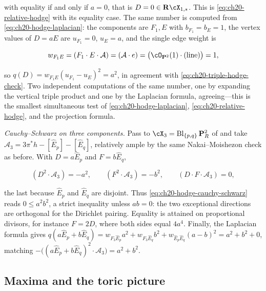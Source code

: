 \begin{example}
with equality if and only if $a=0$, that is $D=0\in\mathbf R\cX_{1,s}$.
This is \eqref{eq:ch20-relative-hodge} with its equality case.  The same
number is computed from \eqref{eq:ch20-hodge-laplacian}: the components are
$F_1,E$ with $b_{F_1}=b_E=1$, the vertex values of $D=aE$ are
$u_{F_1}=0$, $u_E=a$, and the single edge weight is

\[
 w_{F_1E}=(F_1\cdot E\cdot\mathcal A)=(\mathcal A\cdot e)
 =\bigl(\cO_{\mathbf P^2}(1)\cdot(\text{line})\bigr)=1 ,
\]

so $q(D)=w_{F_1E}(u_{F_1}-u_E)^2=a^2$, in agreement with
\eqref{eq:ch20-triple-hodge-check}.  Two independent computations of the
same number, one by expanding the vertical triple product and one by the
Laplacian formula,
agreeing---this is the smallest simultaneous test of
\eqref{eq:ch20-hodge-laplacian}, \eqref{eq:ch20-relative-hodge}, and the
projection formula.

\emph{Cauchy--Schwarz on three components.}  Pass to
$\cX_3=\operatorname{Bl}_{\{p,q\}}\mathbf P^2_R$ of
 and take
$\mathcal A_3=3\pi^*h-[\widehat E_p]-[\widehat E_q]$, relatively ample by
the same Nakai--Moishezon check as before.  With
$D=a\widehat E_p$ and $F=b\widehat E_q$,

\[
 (D^2\cdot\mathcal A_3)=-a^2,\qquad
 (F^2\cdot\mathcal A_3)=-b^2,\qquad
 (D\cdot F\cdot\mathcal A_3)=0 ,
\]

the last because $\widehat E_p$ and $\widehat E_q$ are disjoint.  Thus
\eqref{eq:ch20-hodge-cauchy-schwarz} reads $0\leq a^2b^2$, a strict
inequality unless $ab=0$: the two exceptional directions are orthogonal
for the Dirichlet pairing.  Equality is attained on proportional divisors,
for instance $F=2D$, where both sides equal $4a^4$.  Finally, the
Laplacian formula gives
$q(a\widehat E_p+b\widehat E_q)=w_{F_3\widehat E_p}a^2
 +w_{F_3\widehat E_q}b^2+w_{\widehat E_p\widehat E_q}(a-b)^2
 =a^2+b^2+0$, matching
$-\bigl((a\widehat E_p+b\widehat E_q)^2\cdot\mathcal A_3\bigr)=a^2+b^2$.
\end{example}

\subsection{Maxima and the toric picture}
\label{sec:ch20-ex-max-toric}


